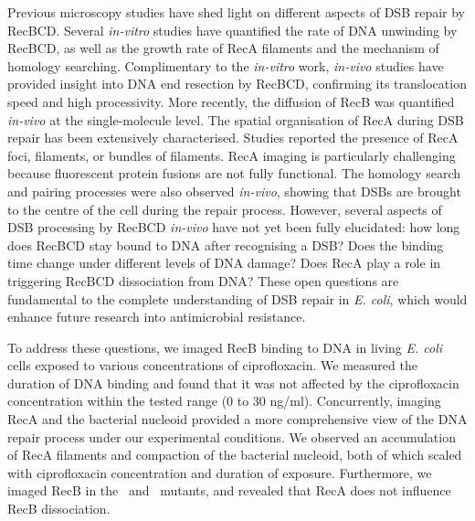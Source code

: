 Previous microscopy studies have shed light on different aspects of DSB repair by RecBCD. Several \emph{in-vitro} studies have quantified the rate of DNA unwinding by RecBCD\cite{Spies2003,Liu2013}, as well as the growth rate of RecA filaments\cite{Joo2006,Galletto2006,Handa2009} and the mechanism of homology searching\cite{Forget2012,Ragunathan2012}. Complimentary to the \emph{in-vitro} work, \emph{in-vivo} studies have provided insight into DNA end resection by RecBCD\cite{Wiktor2018}, confirming its translocation speed and high processivity. More recently, the diffusion of RecB was quantified \emph{in-vivo} at the single-molecule level\cite{Lepore2023}. The spatial organisation of RecA during DSB repair has been extensively characterised. Studies reported the presence of RecA foci\cite{Renzette2005,Renzette2007,Centore2007,Amarh2018}, filaments\cite{Kidane2005}, or bundles of filaments\cite{Lesterlin2013,Ghodke2019}. RecA imaging is particularly challenging because fluorescent protein fusions are not fully functional. The homology search and pairing processes were also observed \emph{in-vivo}, showing that DSBs are brought to the centre of the cell during the repair process\cite{Badrinarayanan2015,Wiktor2021}. However, several aspects of DSB processing by RecBCD \emph{in-vivo} have not yet been fully elucidated: how long does RecBCD stay bound to DNA after recognising a DSB? Does the binding time change under different levels of DNA damage? Does RecA play a role in triggering RecBCD dissociation from DNA? These open questions are fundamental to the complete understanding of DSB repair in \emph{E. coli}, which would enhance future research into antimicrobial resistance.

To address these questions, we imaged RecB binding to DNA in living \emph{E. coli} cells exposed to various concentrations of ciprofloxacin. We measured the duration of DNA binding and found that it was not affected by the ciprofloxacin concentration within the tested range (0 to 30 ng/ml). Concurrently, imaging RecA and the bacterial nucleoid provided a more comprehensive view of the DNA repair process under our experimental conditions. We observed an accumulation of RecA filaments and compaction of the bacterial nucleoid, both of which scaled with ciprofloxacin concentration and duration of exposure. Furthermore, we imaged RecB in the \dreca\ and \teneighty\ mutants, and revealed that RecA does not influence RecB dissociation.
